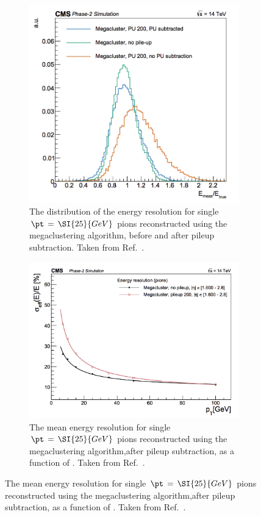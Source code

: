 \begin{figure}[h!]
  \centering
  \begin{subfigure}{0.44\textwidth}
    \includegraphics[width=\textwidth]{Figures/HGCAL/SingleMegacluster.png}
    \caption{The distribution of the energy resolution for single $\pt\,=\,\SI{25}{GeV}$ pions reconstructed using the megaclustering algorithm, 
    before and after pileup subtraction. Taken from Ref.~\cite{HGCAL}.}
    \label{fig:hgcal_SingleMegacluster}
  \end{subfigure}
  \begin{subfigure}{0.54\textwidth}
    \includegraphics[width=\textwidth]{Figures/HGCAL/MegaclusterVsPt.png}
    \caption{The mean energy resolution for single $\pt\,=\,\SI{25}{GeV}$ pions reconstructed using the megaclustering algorithm,after pileup subtraction, as a function of \pt. Taken from Ref.~\cite{HGCAL}.}
    \label{fig:hgcal_MegaclusterVsPt}
  \end{subfigure}
\end{figure}


